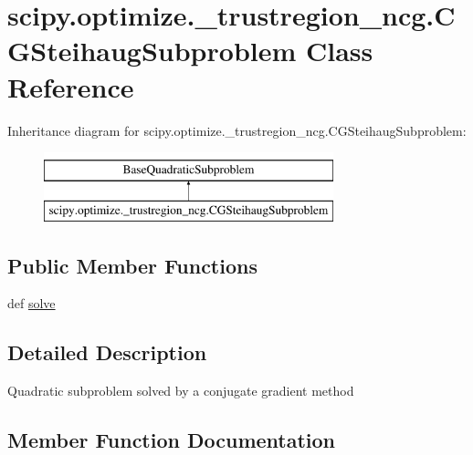 \hypertarget{classscipy_1_1optimize_1_1__trustregion__ncg_1_1CGSteihaugSubproblem}{}\section{scipy.\+optimize.\+\_\+trustregion\+\_\+ncg.\+C\+G\+Steihaug\+Subproblem Class Reference}
\label{classscipy_1_1optimize_1_1__trustregion__ncg_1_1CGSteihaugSubproblem}
Inheritance diagram for scipy.\+optimize.\+\_\+trustregion\+\_\+ncg.\+C\+G\+Steihaug\+Subproblem\+:\begin{figure}[H]
\begin{center}
\leavevmode
\includegraphics[height=2.000000cm]{classscipy_1_1optimize_1_1__trustregion__ncg_1_1CGSteihaugSubproblem}
\end{center}
\end{figure}
\subsection*{Public Member Functions}
\begin{DoxyCompactItemize}
\item 
def \hyperlink{classscipy_1_1optimize_1_1__trustregion__ncg_1_1CGSteihaugSubproblem_a16b7bd4b83c30d86747448af7cd684d0}{solve}
\end{DoxyCompactItemize}


\subsection{Detailed Description}
\begin{DoxyVerb}Quadratic subproblem solved by a conjugate gradient method\end{DoxyVerb}
 

\subsection{Member Function Documentation}
\hypertarget{classscipy_1_1optimize_1_1__trustregion__ncg_1_1CGSteihaugSubproblem_a16b7bd4b83c30d86747448af7cd684d0}{}
